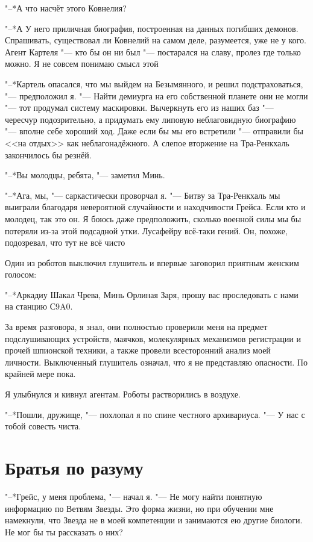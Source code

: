 \documentclass[a4paper,10pt]{book}
\newcommand{\ldotst}{\so{...}\xspace}
\begin{document}
"--*А что насчёт этого Ковнелия?

"--*А\ldotst У него приличная биография, построенная на данных погибших 
демонов. 
Спрашивать, существовал ли Ковнелий на самом деле, разумеется, уже не у кого. 
Агент Картеля "--- кто бы он ни был "--- постарался на славу, пролез где только 
можно. Я не совсем понимаю смысл этой\ldotst

"--*Картель опасался, что мы выйдем на Безымянного, и решил подстраховаться, 
"--- предположил я. "--- Найти демиурга на его собственной планете они не могли 
"--- тот продумал систему маскировки. Вычеркнуть его из наших баз "--- чересчур 
подозрительно, а придумать ему липовую неблаговидную биографию "--- вполне себе 
хороший ход. Даже если бы мы его встретили "--- отправили бы <<на отдых>> как 
неблагонадёжного. А слепое вторжение на Тра-Ренкхаль закончилось бы резнёй.

"--*Вы молодцы, ребята, "--- заметил Минь.

"--*Ага, мы, "--- саркастически проворчал я. "--- Битву за Тра-Ренкхаль мы 
выиграли благодаря невероятной случайности и находчивости Грейса. Если кто и 
молодец, так это он. Я боюсь даже предположить, сколько военной силы мы бы 
потеряли из-за этой подсадной утки. Лусафейру всё-таки гений. Он, похоже, 
подозревал, что тут не всё чисто\ldotst

Один из роботов выключил глушитель и впервые заговорил приятным женским 
голосом: 

"--*Аркадиу Шакал Чрева, Минь Орлиная Заря, прошу вас проследовать с нами на 
станцию С9A0.

За время разговора, я знал, они полностью проверили меня на предмет 
подслушивающих устройств, маячков, молекулярных механизмов регистрации и прочей 
шпионской техники, а также провели всесторонний анализ моей личности. 
Выключенный глушитель означал, что я не представляю опасности. По крайней мере 
пока.

Я улыбнулся и кивнул агентам. Роботы растворились в воздухе.

"--*Пошли, дружище, "--- похлопал я по спине честного архивариуса. "--- У нас с 
тобой совесть чиста.

\section{Братья по разуму}

"--*Грейс, у меня проблема, "--- начал я. "--- Не могу найти понятную 
информацию 
по Ветвям Звезды. Это форма жизни, но при обучении мне намекнули, 
что Звезда не в моей компетенции и занимаются ею другие биологи. Не мог бы ты 
рассказать о них?
\end{document}
